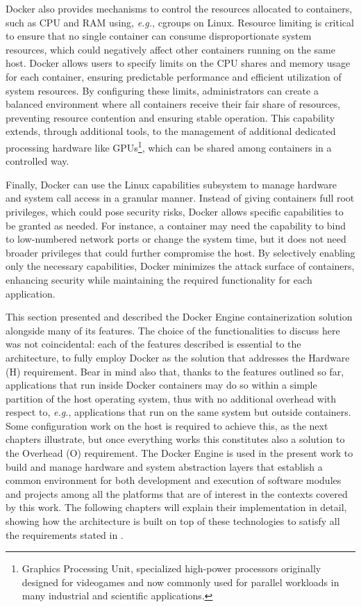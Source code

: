 Docker also provides mechanisms to control the resources allocated to containers, such as CPU and RAM using, \emph{e.g.}, cgroups on Linux. Resource limiting is critical to ensure that no single container can consume disproportionate system resources, which could negatively affect other containers running on the same host. Docker allows users to specify limits on the CPU shares and memory usage for each container, ensuring predictable performance and efficient utilization of system resources. By configuring these limits, administrators can create a balanced environment where all containers receive their fair share of resources, preventing resource contention and ensuring stable operation. This capability extends, through additional tools, to the management of additional dedicated processing hardware like GPUs\footnote{Graphics Processing Unit, specialized high-power processors originally designed for videogames and now commonly used for parallel workloads in many industrial and scientific applications.}, which can be shared among containers in a controlled way.

Finally, Docker can use the Linux capabilities subsystem to manage hardware and system call access in a granular manner. Instead of giving containers full root privileges, which could pose security risks, Docker allows specific capabilities to be granted as needed. For instance, a container may need the capability to bind to low-numbered network ports or change the system time, but it does not need broader privileges that could further compromise the host. By selectively enabling only the necessary capabilities, Docker minimizes the attack surface of containers, enhancing security while maintaining the required functionality for each application.

This section presented and described the Docker Engine containerization solution alongside many of its features. The choice of the functionalities to discuss here was not coincidental: each of the features described is essential to the architecture, to fully employ Docker as the solution that addresses the Hardware (H) requirement. Bear in mind also that, thanks to the features outlined so far, applications that run inside Docker containers may do so within a simple partition of the host operating system, thus with no additional overhead with respect to, \emph{e.g.}, applications that run on the same system but outside containers. Some configuration work on the host is required to achieve this, as the next chapters illustrate, but once everything works this constitutes also a solution to the Overhead (O) requirement. The Docker Engine is used in the present work to build and manage hardware and system abstraction layers that establish a common environment for both development and execution of software modules and projects among all the platforms that are of interest in the contexts covered by this work. The following chapters will explain their implementation in detail, showing how the architecture is built on top of these technologies to satisfy all the requirements stated in .
